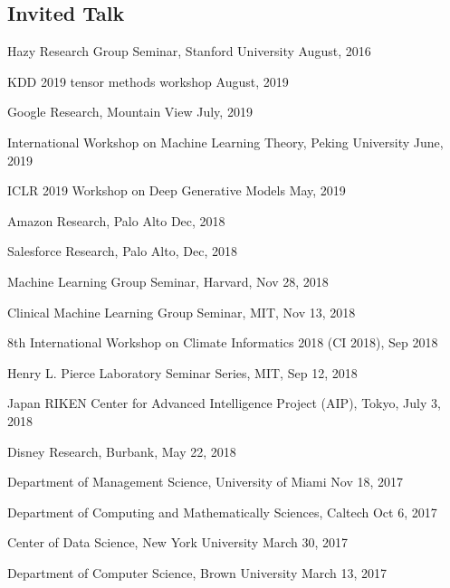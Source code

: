 \documentclass[margin,line]{res}
\begin{document}
\begin{resume}





\section{\sc Invited Talk}
Hazy Research Group Seminar,  Stanford University  \hfill {August, 2016}

KDD 2019 tensor methods workshop \hfill{August, 2019}

Google  Research, Mountain View \hfill{July, 2019}

International Workshop on Machine Learning Theory,  Peking University \hfill{June, 2019}

ICLR 2019 Workshop on Deep Generative Models \hfill{May, 2019}

Amazon Research, Palo Alto \hfill{Dec, 2018}

Salesforce Research, Palo Alto, \hfill{Dec, 2018}

Machine Learning Group Seminar, Harvard, \hfill {Nov 28, 2018} 

Clinical Machine Learning Group Seminar, MIT, \hfill {Nov 13,  2018} 


8th International Workshop on Climate Informatics 2018 (CI 2018), \hfill {Sep 2018} 

Henry L. Pierce Laboratory Seminar Series, MIT, \hfill {Sep 12, 2018}

Japan RIKEN  Center for Advanced Intelligence Project (AIP), Tokyo, \hfill {July 3, 2018}

Disney Research, Burbank, \hfill {May 22, 2018}


Department of Management Science,  University of Miami  \hfill {Nov 18, 2017}


Department of Computing and Mathematically Sciences,  Caltech  \hfill {Oct 6, 2017}


Center of Data Science, New York University  \hfill {March 30, 2017}


Department of Computer Science, Brown University   \hfill {March 13, 2017}




\end{resume}
\end{document}
